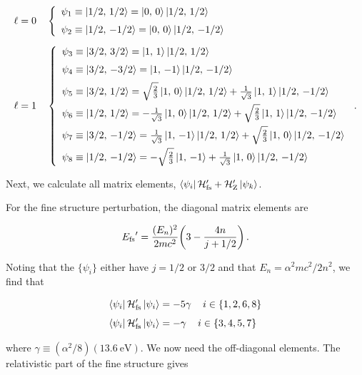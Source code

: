 \documentclass[12pt, titlepage]{article}
\begin{document}
\begin{align*}
	&\ell = 0 \quad
	\left\{ 
	\begin{array}{l}
	\psi_1 \equiv \ket{1/2,\, 1/2} = \ket{0,\, 0}\ket{1/2,\, 1/2} \\[6pt]
	\psi_2 \equiv \ket{1/2,\, -1/2} = \ket{0,\, 0}\ket{1/2,\, -1/2}
	\end{array}
	\right. \\[6pt]
	&\ell = 1 \quad
	\left\{ 
	\begin{array}{l}
	\psi_3 \equiv \ket{3/2,\, 3/2} = \ket{1,\, 1}\ket{1/2,\, 1/2} \\[6pt]
	\psi_4 \equiv \ket{3/2,\, -3/2} = \ket{1,\, -1}\ket{1/2,\, -1/2} \\[6pt]
	\psi_5 \equiv \ket{3/2,\, 1/2} = \sqrt{\frac{2}{3}}\ket{1,\, 0}\ket{1/2,\, 1/2} + \frac{1}{\sqrt{3}}\ket{1,\, 1}\ket{1/2,\, -1/2} \\[6pt]
	\psi_6 \equiv \ket{1/2,\, 1/2} = -\frac{1}{\sqrt{3}}\ket{1,\, 0}\ket{1/2,\, 1/2} + \sqrt{\frac{2}{3}}\ket{1,\, 1}\ket{1/2,\, -1/2} \\[6pt]
	\psi_7 \equiv \ket{3/2,\, -1/2} = \frac{1}{\sqrt{3}}\ket{1,\, -1}\ket{1/2,\, 1/2} + \sqrt{\frac{2}{3}}\ket{1,\, 0}\ket{1/2,\, -1/2} \\[6pt]
	\psi_8 \equiv \ket{1/2,\, -1/2} = -\sqrt{\frac{2}{3}}\ket{1,\, -1} + \frac{1}{\sqrt{3}} \ket{1,\, 0}\ket{1/2,\, -1/2}
	\end{array}
	\right. \,.
\end{align*}

Next, we calculate all matrix elements, $\bra{\psi_i}\mathcal{H}_\text{fs}^\prime + \mathcal{H}_\text{Z}^\prime\ket{\psi_k}$.

For the fine structure perturbation, the diagonal matrix elements are

\begin{equation*}
	{E_\text{fs}}^\prime = \frac{(E_n)^2}{2mc^2}\qty(3-\frac{4n}{j+1/2}) \,.
\end{equation*}

Noting that the $\{\psi_i\}$ either have $j=1/2$ or $3/2$ and that $E_n = \alpha^2mc^2/2n^2$, we find that 

\begin{align}
	\bra{\psi_i}\mathcal{H}_\text{fs}^\prime\ket{\psi_i} &= -5\gamma \, \quad i\in\{1, 2, 6, 8\} \\[4pt]
		\bra{\psi_i}\mathcal{H}_\text{fs}^\prime\ket{\psi_i} &= -\gamma\,  \quad i\in\{3, 4, 5, 7\}
\end{align}

where $\gamma \equiv (\alpha^2/8)(\SI{13.6}{\eV})$. We now need the off-diagonal elements. The relativistic part of the fine structure gives
\end{document}
